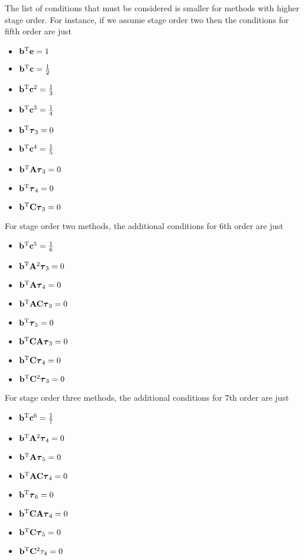 The list of conditions that must be considered is smaller for methods with higher stage
order.  For instance, if we assume stage order two then
the conditions for fifth order are just
\begin{itemize}
  \item $\mathbf{b}^\mathrm{T} \mathbf{e} = 1$
  \item $\mathbf{b}^\mathrm{T} \mathbf{c} = \frac{1}{2}$
  \item $\mathbf{b}^\mathrm{T} \mathbf{c}^2 = \frac{1}{3}$
  \item $\mathbf{b}^\mathrm{T} \mathbf{c}^3 = \frac{1}{4}$
  \item $\mathbf{b}^\mathrm{T} \boldsymbol{\tau}_3 = 0$
  \item $\mathbf{b}^\mathrm{T} \mathbf{c}^4 = \frac{1}{5}$
  \item $\mathbf{b}^\mathrm{T} \mathbf{A} \boldsymbol{\tau}_3 = 0$
  \item $\mathbf{b}^\mathrm{T} \boldsymbol{\tau}_4 = 0$
  \item $\mathbf{b}^\mathrm{T} \mathbf{C} \boldsymbol{\tau}_3 = 0$
\end{itemize}
For stage order two methods, the additional conditions for 6th order are just
\begin{itemize}
  \item $\mathbf{b}^\mathrm{T} \mathbf{c}^5 = \frac{1}{6}$
  \item $\mathbf{b}^\mathrm{T} \mathbf{A}^2 \boldsymbol{\tau}_3 = 0$
  \item $\mathbf{b}^\mathrm{T} \mathbf{A} \boldsymbol{\tau}_4 = 0$
  \item $\mathbf{b}^\mathrm{T} \mathbf{A} \mathbf{C} \boldsymbol{\tau}_3 = 0$
  \item $\mathbf{b}^\mathrm{T} \boldsymbol{\tau}_5 = 0$
  \item $\mathbf{b}^\mathrm{T} \mathbf{C} \mathbf{A} \boldsymbol{\tau}_3 = 0$
  \item $\mathbf{b}^\mathrm{T} \mathbf{C} \boldsymbol{\tau}_4 = 0$
  \item $\mathbf{b}^\mathrm{T} \mathbf{C}^2 \boldsymbol{\tau}_3 = 0$
\end{itemize}
For stage order three methods, 
the additional conditions for 7th order are just
\begin{itemize}
  \item $\mathbf{b}^\mathrm{T} \mathbf{c}^6 = \frac{1}{7}$
  \item $\mathbf{b}^\mathrm{T} \mathbf{A}^2 \boldsymbol{\tau}_4 = 0$
  \item $\mathbf{b}^\mathrm{T} \mathbf{A} \boldsymbol{\tau}_5 = 0$
  \item $\mathbf{b}^\mathrm{T} \mathbf{A}\mathbf{C}\boldsymbol{\tau}_4 = 0$
  \item $\mathbf{b}^\mathrm{T} \boldsymbol{\tau}_6 = 0$
  \item $\mathbf{b}^\mathrm{T} \mathbf{C}\mathbf{A}\boldsymbol{\tau}_4 = 0$
  \item $\mathbf{b}^\mathrm{T} \mathbf{C}\boldsymbol{\tau}_5 = 0$
  \item $\mathbf{b}^\mathrm{T} \mathbf{C}^2 \tau_4 = 0$
\end{itemize}
